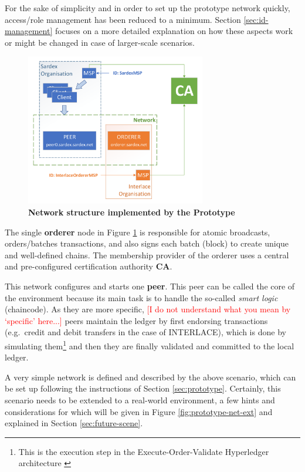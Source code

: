 For the sake of simplicity and in order to set up the prototype network quickly, access/role management has been reduced to a minimum. Section \ref{sec:id-management} focuses on a more detailed explanation on how these aspects work or might be changed in case of larger-scale scenarios.  

\begin{figure}[htbp]
  \centering
  \includegraphics[width=0.7\textwidth, clip, trim=1mm 1mm 1mm 1mm]{Figures/basic-network}
  \caption{\bf\small Network structure implemented by the Prototype}
  \label{fig:prototype-net}
\end{figure}

The single \textbf{orderer} node in Figure \ref{fig:prototype-net} is responsible for atomic broadcasts, orders/batches transactions, and also signs each batch (block) to create unique and well-defined chains. The membership provider of the orderer uses a central and pre-configured certification authority \textbf{CA}.

This network configures and starts one \textbf{peer}. This peer can be called the core of the environment because its main task is to handle the so-called \textit{smart logic} (chaincode). As they are more specific, \textcolor{red}{[I do not understand what you mean by `specific' here...]} peers maintain the ledger by first endorsing transactions (e.g.\ credit and debit transfers in the case of INTERLACE), which is done by simulating them\footnote{This is the execution step in the Execute-Order-Validate Hyperledger architecture \cite{AndroulakiEtAl2018}} and then they are finally validated and committed to the local ledger.

A very simple network is defined and described by the above scenario, which can be set up following the instructions of Section \ref{sec:prototype}. Certainly, this scenario needs to be extended to a real-world environment, a few hints and considerations for which will be given in Figure \ref{fig:prototype-net-ext} and explained in Section \ref{sec:future-scene}.

